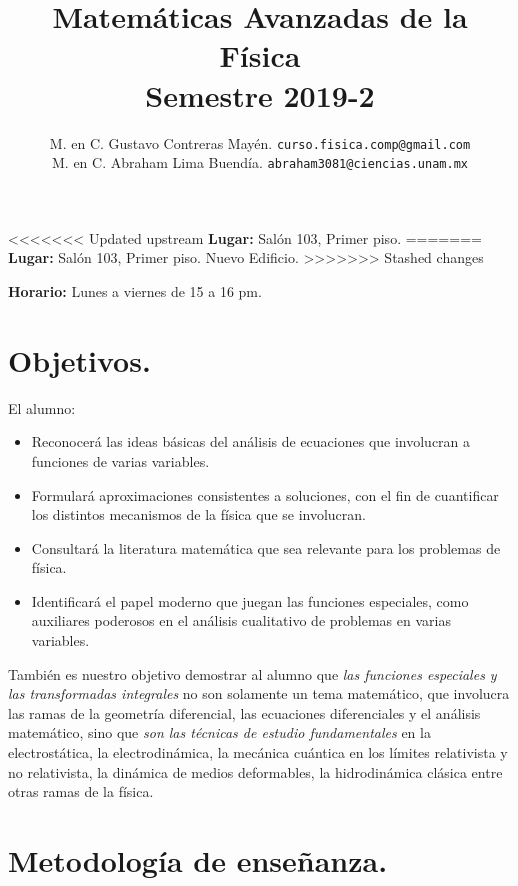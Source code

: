 \documentclass[12pt]{article}
\author{M. en C. Gustavo Contreras Mayén. \texttt{curso.fisica.comp@gmail.com}\\
M. en C. Abraham Lima Buendía. \texttt{abraham3081@ciencias.unam.mx}}
\title{Matemáticas Avanzadas de la Física \\ {\large Semestre 2019-2}}
\date{ }
\begin{document}
\vspace{-4cm}
\renewcommand\labelenumii{\theenumi.{\arabic{enumii}}}
\maketitle
\fontsize{14}{14}\selectfont
<<<<<<< Updated upstream
\textbf{Lugar: } Salón 103, Primer piso.
=======
\textbf{Lugar: } Salón 103, Primer piso. Nuevo Edificio.
>>>>>>> Stashed changes
\par
\textbf{Horario: } Lunes a viernes de 15 a 16 pm.
\section{Objetivos.}
El alumno:
\begin{itemize}
\setlength{\itemsep}{0mm}
\item Reconocerá las ideas básicas del análisis de ecuaciones que involucran a funciones de varias variables.
\item Formulará aproximaciones consistentes a soluciones, con el fin de cuantificar los distintos mecanismos de la física que se involucran.
\item Consultará la literatura matemática que sea relevante para los problemas de física.
\item Identificará el papel moderno que juegan las funciones especiales, como auxiliares poderosos en el análisis cualitativo de problemas en varias variables.
\end{itemize}
También es nuestro objetivo demostrar al alumno que \emph{las funciones especiales y las transformadas integrales} no son solamente un tema matemático, que involucra las ramas de la geometría diferencial, las ecuaciones diferenciales y el análisis matemático, sino que \emph{son las técnicas de estudio fundamentales} en la electrostática, la electrodinámica, la mecánica cuántica en los límites relativista y no relativista, la dinámica de medios deformables, la hidrodinámica clásica entre otras ramas de la física.
\section{Metodología de enseñanza.}
\end{document}
